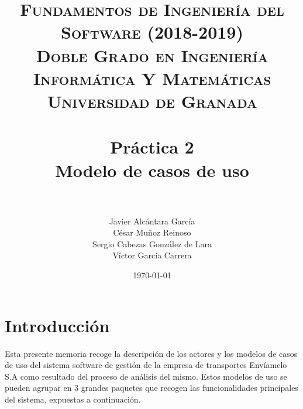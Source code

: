 


\graphicspath{{images/}}


\title{	
\normalfont \normalsize 
\textsc{\textbf{Fundamentos de Ingeniería del Software (2018-2019)} \\ Doble Grado en Ingeniería Informática Y Matemáticas \\ Universidad de Granada} \\ [25pt] %
\horrule{0.5pt} \\[0.4cm] %
\huge \textbf{Práctica 2} \\ Modelo de casos de uso \\ %
\horrule{2pt} \\[0.5cm] %
}

\author{Javier Alcántara García\\ César Muñoz Reinoso \\ Sergio Cabezas González de Lara \\ Víctor García Carrera} %

\date{\normalsize\today} %





\maketitle %

\newpage %

\tableofcontents %

\newpage

\section{Introducción}
Esta presente memoria recoge la descripción de los actores y los modelos de casos de uso del sistema software de gestión de la empresa de transportes Envíamelo S.A como resultado del proceso de análisis del mismo. Estos modelos de uso se pueden agrupar en 3 grandes paquetes que recogen las funcionalidades principales del sistema, expuestas a continuación.

